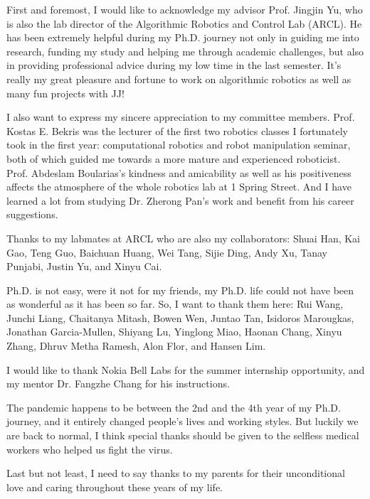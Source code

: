 
\begin{acknowledgments}
First and foremost, I would like to acknowledge my advisor Prof. Jingjin Yu, 
who is also the lab director of the Algorithmic Robotics and Control Lab (ARCL). 
He has been extremely helpful during my Ph.D. journey 
not only in guiding me into research, funding my study and helping me through academic challenges, 
but also in providing professional advice during my low time in the last semester. 
It's really my great pleasure and fortune to work on algorithmic robotics 
as well as many fun projects with JJ! 

I also want to express my sincere appreciation to my committee members. 
Prof. Kostas E. Bekris was the lecturer of the first two robotics classes I fortunately took in the first year: 
computational robotics and robot manipulation seminar, both of which guided me 
towards a more mature and experienced roboticist. 
Prof. Abdeslam Boularias's kindness and amicability as well as his positiveness affects
the atmosphere of the whole robotics lab at 1 Spring Street.
And I have learned a lot from studying Dr. Zherong Pan's work and benefit from his career suggestions.

Thanks to my labmates at ARCL who are also my collaborators: Shuai Han, 
Kai Gao, Teng Guo, Baichuan Huang, Wei Tang, Sijie Ding, Andy Xu, Tanay Punjabi, 
Justin Yu, and Xinyu Cai. 

Ph.D. is not easy, were it not for my friends, my Ph.D. life 
could not have been as wonderful as it has been so far. 
So, I want to thank them here: Rui Wang, Junchi Liang, Chaitanya Mitash, Bowen Wen, Juntao Tan, 
Isidoros Marougkas, Jonathan Garcia-Mullen, Shiyang Lu, Yinglong Miao, Haonan Chang, Xinyu Zhang, 
Dhruv Metha Ramesh, Alon Flor, and Hansen Lim. 

I would like to thank Nokia Bell Labs for the summer internship opportunity,
and my mentor Dr. Fangzhe Chang for his instructions.

The pandemic happens to be between the 2nd and the 4th year of my Ph.D. journey, 
and it entirely changed people's lives and working styles. 
But luckily we are back to normal, I think special thanks should be given to the 
selfless medical workers who helped us fight the virus. 

Last but not least, I need to say thanks to my parents for their unconditional love 
and caring throughout these years of my life. 

\end{acknowledgments}
